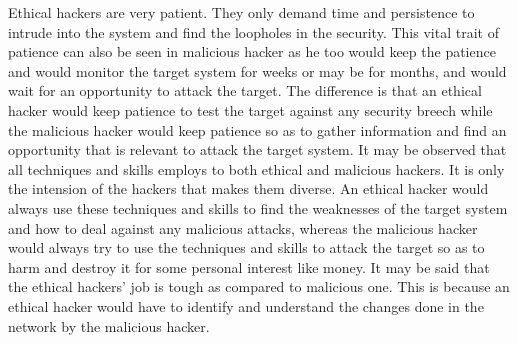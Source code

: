 Ethical hackers are very patient. They only demand 
time and persistence to intrude into the system and find the 
loopholes in the security. This vital trait of patience can 
also be seen in malicious hacker as he too would keep the 
patience and would monitor the target system for weeks or 
may be for months, and would wait for an opportunity to 
attack the target. The difference is that an ethical hacker 
would keep patience to test the target against any security 
breech while the malicious hacker would keep patience so 
as to gather information and find an opportunity that is 
relevant to attack the target system. It may be observed that 
all techniques and skills employs to both ethical and 
malicious hackers. It is only the intension of the hackers 
that makes them diverse. An ethical hacker would always 
use these techniques and skills to find the weaknesses of 
the target system and how to deal against any malicious 
attacks, whereas the malicious hacker would always try to 
use the techniques and skills to attack the target so as to 
harm and destroy it for some personal interest like money. 
It may be said that the ethical hackers’ job is tough as 
compared to malicious one. This is because an ethical 
hacker would have to identify and understand the changes 
done in the network by the malicious hacker. 

